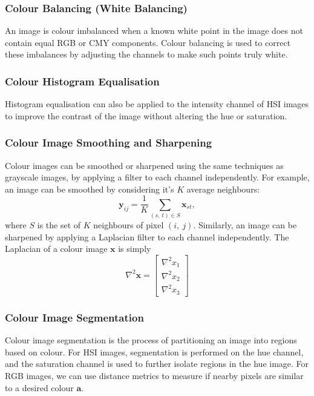 \documentclass{article}
\begin{document}
\subsubsection{Colour Balancing (White Balancing)}
An image is colour imbalanced when a known white point in the image does
not contain equal RGB or CMY components. Colour balancing is used to
correct these imbalances by adjusting the channels to make such points
truly white.
\subsubsection{Colour Histogram Equalisation}
Histogram equalisation can also be applied to the intensity channel of
HSI images to improve the contrast of the image without altering the
hue or saturation.
\subsubsection{Colour Image Smoothing and Sharpening}
Colour images can be smoothed or sharpened using the same techniques as
grayscale images, by applying a filter to each channel independently.
For example, an image can be smoothed by considering it's \(K\) average
neighbours:
\begin{equation*}
    \symbf{y}_{ij} = \frac{1}{K} \sum_{\left( s,\: t \right) \in S} \symbf{x}_{st},
\end{equation*}
where \(S\) is the set of \(K\) neighbours of pixel \(\left( i,\: j \right)\).
Similarly, an image can be sharpened by applying a Laplacian filter to
each channel independently. The Laplacian of a colour image \(\symbf{x}\)
is simply
\begin{equation*}
    \nabla^2 \symbf{x} = \begin{bmatrix}
        \nabla^2 x_1 \\
        \nabla^2 x_2 \\
        \nabla^2 x_3
    \end{bmatrix}
\end{equation*}
\subsubsection{Colour Image Segmentation}
Colour image segmentation is the process of partitioning an image into
regions based on colour. For HSI images, segmentation is performed on the
hue channel, and the saturation channel is used to further isolate
regions in the hue image. For RGB images, we can use distance metrics to
measure if nearby pixels are similar to a desired colour \(\symbf{a}\).
\end{document}
